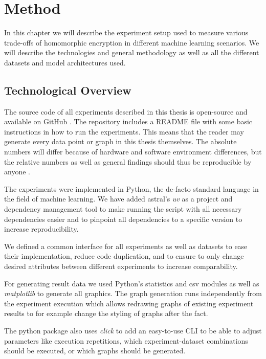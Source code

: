 \chapter{Method}

In this chapter we will describe the experiment setup used to measure various trade-offs of homomorphic encryption in different machine learning scenarios. We will describe the technologies and general methodology as well as all the different datasets and model architectures used.

\section{Technological Overview}

The source code of all experiments described in this thesis is open-source and available on GitHub \cite{partanen_julianfpfhe-experiments_2025}. The repository includes a README file with some basic instructions in how to run the experiments. This means that the reader may generate every data point or graph in this thesis themselves. The absolute numbers will differ because of hardware and software environment differences, but the relative numbers as well as general findings should thus be reproducible by anyone .

The experiments were implemented in Python, the de-facto standard language in the field of machine learning. We have added astral's \emph{uv} \cite{astral_uv_nodate} as a project and dependency management tool to make running the script with all necessary dependencies easier and to pinpoint all dependencies to a specific version to increase reproducibility.

We defined a common interface for all experiments as well as datasets to ease their implementation, reduce code duplication, and to ensure to only change desired attributes between different experiments to increase comparability.

For generating result data we used Python's statistics and csv modules as well as \emph{matplotlib} \cite{noauthor_matplotlib_nodate} to generate all graphics. The graph generation runs independently from the experiment execution which allows redrawing graphs of existing experiment results to for example change the styling of graphs after the fact.

The python package also uses \emph{click} \cite{pallets_welcome_nodate} to add an easy-to-use CLI to be able to adjust parameters like execution repetitions, which experiment-dataset combinations should be executed, or which graphs should be generated.


